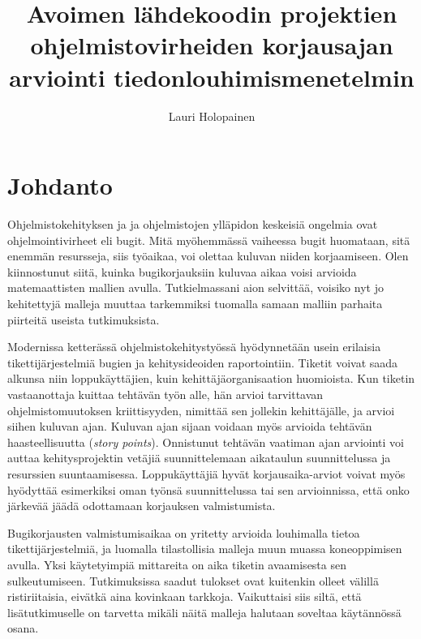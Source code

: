 \documentclass[utf8]{gradu3}
\begin{document}
\title{Avoimen lähdekoodin projektien ohjelmistovirheiden korjausajan arviointi tiedonlouhimismenetelmin}
 \avainsanat{} \keywords{} 
\abstract{}

\author{Lauri Holopainen}

\maketitle

\mainmatter

\chapter{Johdanto}
Ohjelmistokehityksen ja  ja ohjelmistojen ylläpidon keskeisiä ongelmia ovat
ohjelmointivirheet eli bugit. Mitä myöhemmässä vaiheessa bugit huomataan, sitä
enemmän resursseja, siis työaikaa, voi olettaa kuluvan niiden korjaamiseen. Olen
kiinnostunut siitä, kuinka bugikorjauksiin kuluvaa aikaa voisi arvioida
matemaattisten mallien avulla. Tutkielmassani aion selvittää, voisiko nyt jo
kehitettyjä malleja muuttaa tarkemmiksi tuomalla samaan malliin parhaita
piirteitä useista tutkimuksista.

Modernissa ketterässä ohjelmistokehitystyössä hyödynnetään usein erilaisia
tikettijärjestelmiä bugien ja kehitysideoiden raportointiin. Tiketit voivat
saada alkunsa niin loppukäyttäjien, kuin kehittäjäorganisaation huomioista. Kun
tiketin vastaanottaja kuittaa tehtävän työn alle, hän arvioi tarvittavan
ohjelmistomuutoksen kriittisyyden, nimittää sen jollekin kehittäjälle, ja arvioi
siihen kuluvan ajan. Kuluvan ajan sijaan voidaan myös arvioida tehtävän
haasteellisuutta (\textit{story points}). Onnistunut tehtävän vaatiman ajan
arviointi voi auttaa kehitysprojektin vetäjiä suunnittelemaan aikataulun
suunnittelussa ja resurssien suuntaamisessa. Loppukäyttäjiä hyvät
korjausaika-arviot voivat myös hyödyttää esimerkiksi oman työnsä suunnittelussa
tai sen arvioinnissa, että onko järkevää jäädä odottamaan korjauksen
valmistumista.

Bugikorjausten valmistumisaikaa on yritetty arvioida louhimalla tietoa
tikettijärjestelmiä, ja luomalla tilastollisia malleja muun muassa koneoppimisen
avulla. Yksi käytetyimpiä mittareita on aika tiketin avaamisesta sen
sulkeutumiseen. Tutkimuksissa saadut tulokset ovat kuitenkin olleet välillä
ristiriitaisia, eivätkä aina kovinkaan tarkkoja. Vaikuttaisi siis siltä, että
lisätutkimuselle on tarvetta mikäli näitä malleja halutaan soveltaa käytännössä
osana.
\end{document}
